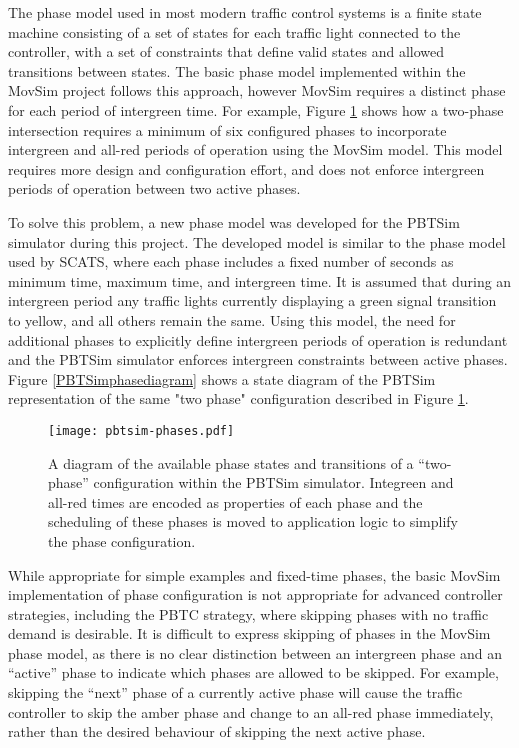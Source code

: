 The phase model used in most modern traffic control systems is a finite state machine consisting of a set of states for each traffic light connected to the controller, with a set of constraints that define valid states and allowed transitions between states. The basic phase model implemented within the MovSim project follows this approach, however MovSim requires a distinct phase for each period of intergreen time. For example, Figure \ref{movsimphasediagram} shows how a two-phase intersection requires a minimum of six configured phases to incorporate intergreen and all-red periods of operation using the MovSim model. This model requires more design and configuration effort, and does not enforce intergreen periods of operation between two active phases.

To solve this problem, a new phase model was developed for the PBTSim simulator during this project. The developed model is similar to the phase model used by SCATS, where each phase includes a fixed number of seconds as minimum time, maximum time, and intergreen time. It is assumed that during an intergreen period any traffic lights currently displaying a green signal transition to yellow, and all others remain the same. Using this model, the need for additional phases to explicitly define intergreen periods of operation is redundant and the PBTSim simulator enforces intergreen constraints between active phases. Figure \ref{PBTSimphasediagram} shows a state diagram of the PBTSim representation of the same "two phase" configuration described in Figure \ref{movsimphasediagram}.

\begin{figure}[]
\centering
	\texttt{[image: pbtsim-phases.pdf]}
	\caption{ A diagram of the available phase states and transitions of a ``two-phase'' configuration within the PBTSim simulator. Integreen and all-red times are encoded as properties of each phase and the scheduling of these phases is moved to application logic to simplify the phase configuration. }
\label{movsimphasediagram}
\end{figure}

While appropriate for simple examples and fixed-time phases, the basic MovSim implementation of phase configuration is not appropriate for advanced controller strategies, including the PBTC strategy, where skipping phases with no traffic demand is desirable. It is difficult to express skipping of phases in the MovSim phase model, as there is no clear distinction between an intergreen phase and an ``active'' phase to indicate which phases are allowed to be skipped. For example, skipping the ``next'' phase of a currently active phase will cause the traffic controller to skip the amber phase and change to an all-red phase immediately, rather than the desired behaviour of skipping the next active phase.

